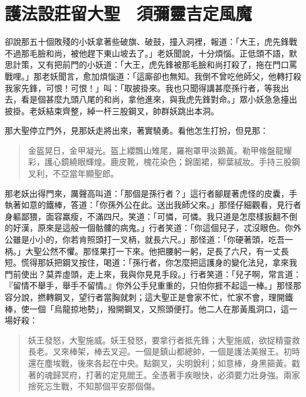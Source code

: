 
\chapter{護法設莊留大聖　須彌靈吉定風魔}

卻說那五十個敗殘的小妖拿著些破旗、破鼓，撞入洞裡，報道：「大王，虎先鋒戰不過那毛臉和尚，被他趕下東山坡去了。」老妖聞說，十分煩惱。正低頭不語，默思計策，又有把前門的小妖道：「大王，虎先鋒被那毛臉和尚打殺了，拖在門口罵戰哩。」那老妖聞言，愈加煩惱道：「這廝卻也無知。我倒不曾吃他師父，他轉打殺我家先鋒，可恨！可恨！」叫：「取披掛來。我也只聞得講甚麼孫行者，等我出去，看是個甚麼九頭八尾的和尚，拿他進來，與我虎先鋒對命。」眾小妖急急擡出披掛。老妖結束齊整，綽一杆三股鋼叉，帥群妖跳出本洞。

那大聖停立門外，見那妖走將出來，著實驍勇。看他怎生打扮，但見那：
\begin{quote}
金盔晃日，金甲凝光。盔上纓飄山雉尾，羅袍罩甲淡鵝黃。勒甲絛盤龍耀彩，護心鏡繞眼輝煌。鹿皮靴，槐花染色；錦圍裙，柳葉絨妝。手持三股鋼叉利，不亞當年顯聖郎。
\end{quote}

那老妖出得門來，厲聲高叫道：「那個是孫行者？」這行者腳屣著虎怪的皮囊，手執著如意的鐵棒，答道：「你孫外公在此。送出我師父來。」那怪仔細觀看，見行者身軀鄙猥，面容羸瘦，不滿四尺。笑道：「可憐，可憐。我只道是怎麼樣扳翻不倒的好漢，原來是這般一個骷髏的病鬼。」行者笑道：「你這個兒子，忒沒眼色。你外公雖是小小的，你若肯照頭打一叉柄，就長六尺。」那怪道：「你硬著頭，吃吾一柄。」大聖公然不懼。那怪果打一下來。他把腰躬一躬，足長了六尺，有一丈長短。慌得那妖把鋼叉按住，喝道：「孫行者，你怎麼把這護身的變化法兒，拿來我門前使出？莫弄虛頭，走上來，我與你見見手段。」行者笑道：「兒子啊，常言道：『留情不舉手，舉手不留情。』你外公手兒重重的，只怕你捱不起這一棒。」那怪那容分說，撚轉鋼叉，望行者當胸就刺；這大聖正是會家不忙，忙家不會，理開鐵棒，使一個「烏龍掠地勢」，撥開鋼叉，又照頭便打。他二人在那黃風洞口，這一場好殺：
\begin{quote}
妖王發怒，大聖施威。妖王發怒，要拿行者抵先鋒；大聖施威，欲捉精靈救長老。叉來棒架，棒去叉迎。一個是鎮山都總帥，一個是護法美猴王。初時還在塵埃戰，後來各起在中央。點鋼叉，尖明銳利；如意棒，身黑箍黃。戳著的魂歸冥府，打著的定見閻王。全憑著手疾眼快，必須要力壯身強。兩家捨死忘生戰，不知那個平安那個傷。
\end{quote}

